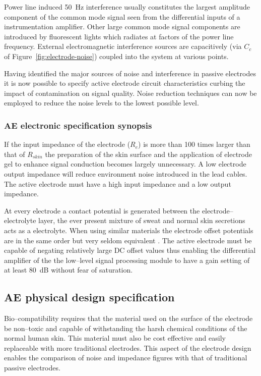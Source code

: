 Power line induced 50~Hz interference usually constitutes the largest
amplitude component of the common mode signal seen from the
differential inputs of a instrumentation amplifier. Other large common
mode signal components are introduced by fluorescent lights which
radiates at factors of the power line frequency. External
electromagnetic interference sources are capacitively (via $C_c$ of
Figure~\vref{fig:electrode-noise}) coupled into the system at various
points.

Having identified the major sources of noise and interference in
passive electrodes it is now possible to specify active electrode
circuit characteristics curbing the impact of contamination on signal
quality. Noise reduction techniques can now be employed to reduce the
noise levels to the lowest possible level.


\subsubsection{AE electronic specification synopsis}
If the input impedance of the electrode ($R_e$) is more than 100 times
larger than that of $R_{skin}$ the preparation of the skin surface and
the application of electrode gel to enhance signal conduction becomes
largely unnecessary. A low electrode output impedance will reduce
environment noise introduced in the lead cables. The active electrode
must have a high input impedance and a low output impedance.


At every electrode a contact potential is generated between the
electrode--electrolyte layer, the ever present mixture of sweat and
normal skin secretions acts as a electrolyte.  When using similar
materials the electrode offset potentials are in the same order but
very seldom equivalent
\cite{buffer}. The active electrode must be capable of negating
relatively large DC offset values thus enabling the differential
amplifier of the the low--level signal processing module to have a
gain setting of at least 80~dB without fear of saturation.


\subsection{AE physical design specification}

Bio--compatibility requires that the material used on the surface of
the electrode be non--toxic and capable of withstanding the harsh
chemical conditions of the normal human skin. This material must also
be cost effective and easily replaceable with more traditional
electrodes. This aspect of the electrode design enables the comparison
of noise and impedance figures with that of traditional passive
electrodes.


